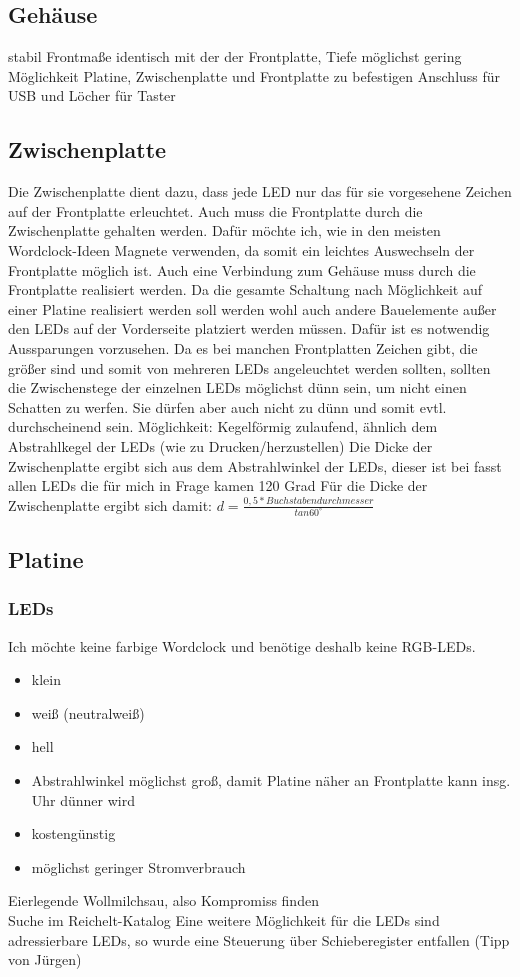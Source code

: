 \documentclass[11pt,a4paper,ngerman]{article}
\begin{document}
\subsection{Gehäuse}
stabil
Frontmaße identisch mit der der Frontplatte, Tiefe möglichst gering 
Möglichkeit Platine, Zwischenplatte und Frontplatte zu befestigen
Anschluss für USB und Löcher für Taster
\subsection{Zwischenplatte}
Die Zwischenplatte dient dazu, dass jede LED nur das für sie vorgesehene Zeichen auf der Frontplatte erleuchtet. Auch muss die Frontplatte durch die Zwischenplatte gehalten werden. Dafür möchte ich, wie in den meisten Wordclock-Ideen Magnete verwenden, da somit ein leichtes Auswechseln der Frontplatte möglich ist. Auch eine Verbindung zum Gehäuse muss durch die Frontplatte realisiert werden. Da die gesamte Schaltung nach Möglichkeit auf einer Platine realisiert werden soll werden wohl auch andere Bauelemente außer den LEDs auf der Vorderseite platziert werden müssen. Dafür ist es notwendig Aussparungen vorzusehen.  
Da es bei manchen Frontplatten Zeichen gibt, die größer sind und somit von mehreren LEDs angeleuchtet werden sollten, sollten die Zwischenstege der einzelnen LEDs möglichst dünn sein, um nicht einen Schatten zu werfen. Sie dürfen aber auch nicht zu dünn und somit evtl. durchscheinend sein. Möglichkeit: Kegelförmig zulaufend, ähnlich dem Abstrahlkegel der LEDs (wie zu Drucken/herzustellen)
Die Dicke der Zwischenplatte ergibt sich aus dem Abstrahlwinkel der LEDs, dieser ist bei fasst allen LEDs die für mich in Frage kamen 120 Grad Für die Dicke der Zwischenplatte ergibt sich damit: $d = \frac{0,5 * Buchstabendurchmesser}{tan60^\circ } $ 
\subsection{Platine}
\subsubsection{LEDs}
Ich möchte keine farbige Wordclock und benötige deshalb keine RGB-LEDs. \\
\begin{itemize}
\item klein
\item weiß (neutralweiß) 
\item hell
\item Abstrahlwinkel möglichst groß, damit Platine näher an Frontplatte kann insg. Uhr dünner wird
\item kostengünstig
\item möglichst geringer Stromverbrauch
\end{itemize}
Eierlegende Wollmilchsau, also Kompromiss finden\\
Suche im Reichelt-Katalog
Eine weitere Möglichkeit für die LEDs sind adressierbare LEDs, so wurde eine Steuerung über Schieberegister entfallen (Tipp von Jürgen)
\end{document}
